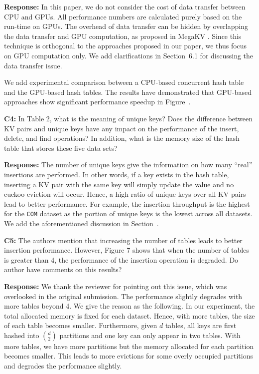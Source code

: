 \noindent\textbf{Response:} 
In this paper, we do not consider the cost of data transfer between CPU and GPUs. All performance numbers are calculated purely based on the run-time on GPUs. 
The overhead of data transfer can be hidden by overlapping the data transfer and GPU computation, as proposed in MegaKV \cite{zhang2015mega}. Since this technique is orthogonal to the approaches proposed in our paper, we thus focus on GPU computation only. We add clarifications in Section~6.1 for discussing the data transfer issue.

We add experimental comparison between a CPU-based concurrent hash table \cite{li2014algorithmic} and the GPU-based hash tables. The results have demonstrated that GPU-based approaches show significant performance speedup in Figure~.  

\begin{shaded}
	\noindent\textbf{C4:} In Table 2, what is the meaning of unique keys? Does the difference between KV pairs and unique keys have any impact on the performance of the insert, delete, and find operations? In addition, what is the memory size of the hash table that stores these five data sets?
\end{shaded}

\noindent\textbf{Response:} 
The number of unique keys give the information on how many ``real'' insertions are performed. In other words, if a key exists in the hash table, inserting a KV pair with the same key will simply update the value and no cuckoo eviction will occur. Hence, a high ratio of unique keys over all KV pairs lead to better performance. For example, the insertion throughput is the highest for the {\tt COM} dataset as the portion of unique keys is the lowest across all datasets. We add the aforementioned discussion in Section~.

\begin{shaded}
	\noindent\textbf{C5:} The authors mention that increasing the number of tables leads to better insertion performance. However, Figure 7 shows that when the number of tables is greater than 4, the performance of the insertion operation is degraded. Do author have comments on this results?
\end{shaded}

\noindent\textbf{Response:} We thank the reviewer for pointing out this issue, which was overlooked in the original submission. The performance slightly degrades with more tables beyond 4. We give the reason as the following. In our experiment, the total allocated memory is fixed for each dataset. 
Hence, with more tables, the size of each table becomes smaller. Furthermore, given $d$ tables, all keys are first hashed into $\binom{d}{2}$ partitions and one key can only appear in two tables. 
With more tables, we have more partitions but the memory allocated for each partition becomes smaller. This leads to more evictions for some overly occupied partitions and degrades the performance slightly. 